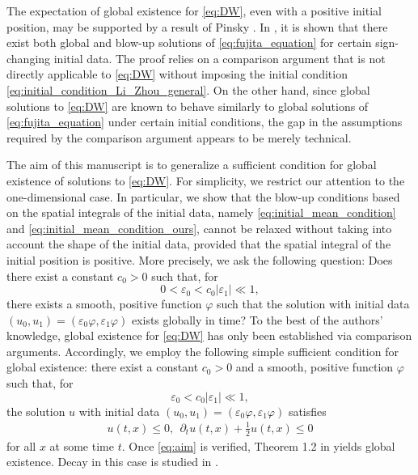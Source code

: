 \documentclass[reqno]{amsart}
\begin{document}
The expectation of global existence for \eqref{eq:DW},
even with a positive initial position,
may be supported by a result of Pinsky \cite{P16}.
In \cite{P16}, it is shown that
there exist both global and blow-up solutions of \eqref{eq:fujita_equation}
for certain sign-changing initial data.
The proof relies on a comparison argument
that is not directly applicable to \eqref{eq:DW}
without imposing the initial condition \eqref{eq:initial_condition_Li_Zhou_general}.
On the other hand,
since global solutions to \eqref{eq:DW}
are known to behave similarly to global solutions of \eqref{eq:fujita_equation}
under certain initial conditions,
the gap in the assumptions required by the comparison argument
appears to be merely technical.

The aim of this manuscript
is to generalize a sufficient condition
for global existence of solutions to \eqref{eq:DW}.
For simplicity, we restrict our attention to the one-dimensional case.
In particular,
we show that the blow-up conditions based on the spatial integrals of the initial data,
namely \eqref{eq:initial_mean_condition} and \eqref{eq:initial_mean_condition_ours},
cannot be relaxed without taking into account the shape of the initial data,
provided that the spatial integral of the initial position is positive.
More precisely, we ask the following question:
Does there exist a constant $c_0 > 0$ such that, for
	\[
	0 < \varepsilon_0 < c_0 |\varepsilon_1| \ll 1,
	\]
there exists a smooth, positive function $\varphi$ such that
the solution with initial data
$(u_0,u_1) = (\varepsilon_0 \varphi, \varepsilon_1 \varphi)$
exists globally in time?
To the best of the authors' knowledge,
global existence for \eqref{eq:DW}
has only been established via comparison arguments.
Accordingly, we employ the following simple sufficient condition for global existence:
there exist a constant $c_0 > 0$ and a smooth, positive function $\varphi$ such that, for
	\[
	\varepsilon_0 < c_0 |\varepsilon_1| \ll 1,
	\]
the solution $u$ with initial data
$(u_0,u_1) = (\varepsilon_0 \varphi, \varepsilon_1 \varphi)$
satisfies
	\begin{align}
	u(t,x) \leq 0,\ \ \partial_t u(t,x) + \frac{1}{2}u(t,x) \leq 0
	\label{eq:aim}
	\end{align}
for all $x$ at some time $t$.
Once \eqref{eq:aim} is verified,
Theorem 1.2 in \cite{FG25a} yields global existence.
Decay in this case is studied in \cite{FG25b}.
\end{document}
